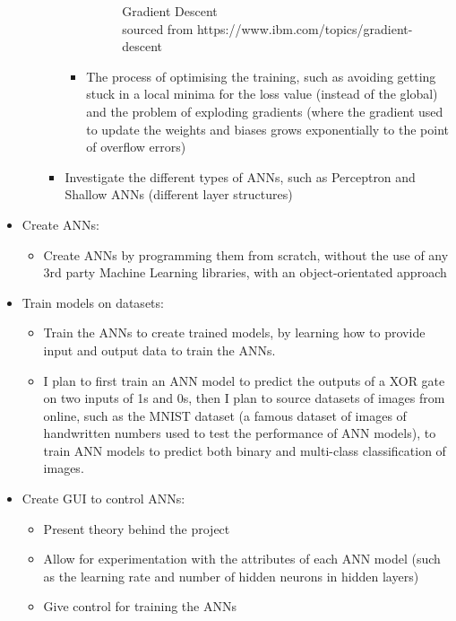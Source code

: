 \documentclass[10pt,a4paper]{article}
\begin{document}
\begin{itemize}
\begin{itemize}
\begin{itemize}
\begin{itemize}
\begin{figure}[h!]
                      \caption{Gradient Descent\\
                               sourced from https://www.ibm.com/topics/gradient-descent}
                      \end{figure}
                \item The process of optimising the training, such as avoiding getting stuck in a local minima for the loss value (instead of the global) and the 
                      problem of exploding gradients (where the gradient used to update the weights and biases grows exponentially to the point of overflow errors)
            \end{itemize}
            \item Investigate the different types of ANNs, such as Perceptron and Shallow ANNs (different layer structures)
        \end{itemize}
    \end{itemize}
    \item Create ANNs:
    \begin{itemize}
        \item Create ANNs by programming them from scratch, without the use of any 3rd party Machine Learning libraries, with an object-orientated approach
    \end{itemize}
    \item Train models on datasets:
    \begin{itemize}
        \item Train the ANNs to create trained models, by learning how to provide input and output data to train the ANNs.
        \item I plan to first train an ANN model to predict the outputs of a XOR gate on two inputs of 1s and 0s, then I plan to source datasets of images from online, 
              such as the MNIST dataset (a famous dataset of images of handwritten numbers used to test the performance of ANN models), to train ANN models to predict 
              both binary and multi-class classification of images.
    \end{itemize}
    \item Create GUI to control ANNs:
    \begin{itemize}
        \item Present theory behind the project
        \item Allow for experimentation with the attributes of each ANN model (such as the learning rate and number of hidden neurons in hidden layers)
        \item Give control for training the ANNs

\end{itemize}
\end{itemize}
\end{document}
